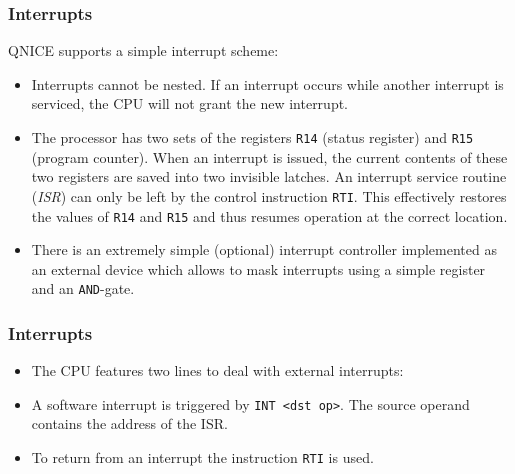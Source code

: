 \documentclass{beamer}
\begin{document}
  \begin{frame}
   \frametitle{Interrupts}
   QNICE supports a simple interrupt scheme:
   \begin{itemize}
    \item Interrupts cannot be nested. If an interrupt occurs while another
     interrupt is serviced, the CPU will not grant the new interrupt.
    \item The processor has two sets of the registers \texttt{R14} (status
     register) and \texttt{R15} (program counter). When an interrupt is 
     issued, the current contents of these two registers are saved into two
     invisible latches. An interrupt service routine (\emph{ISR}) can only
     be left by the control instruction \texttt{RTI}. This effectively
     restores the values of \texttt{R14} and \texttt{R15} and thus resumes 
     operation at the correct location.
    \item There is an extremely simple (optional) interrupt controller 
     implemented as an external device which allows to mask interrupts
     using a simple register and an \texttt{AND}-gate.
   \end{itemize}
  \end{frame}
%
  \begin{frame}
   \frametitle{Interrupts}
   \begin{itemize}
    \item The CPU features two lines to deal with external interrupts:
    \item A software interrupt is triggered by \texttt{INT <dst op>}.
     The source operand contains the address of the ISR.
    \item To return from an interrupt the instruction \texttt{RTI} is
     used.
   \end{itemize}
  \end{frame}
\end{document}
